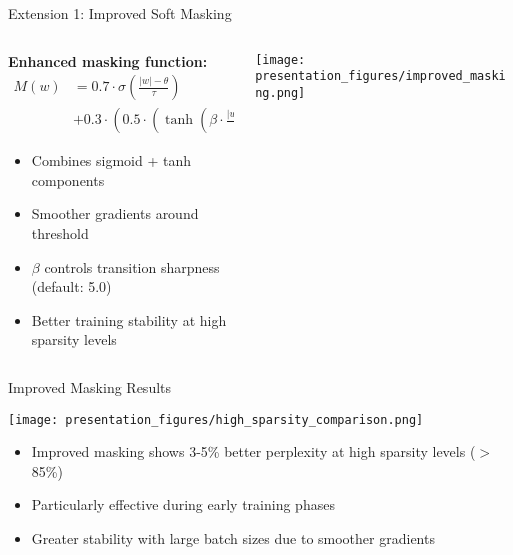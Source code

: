 \documentclass{beamer}
\begin{document}
\begin{frame}{Extension 1: Improved Soft Masking}
\begin{columns}
\begin{column}{0.5\textwidth}
\textbf{Enhanced masking function:}
\begin{align*}
M(w) &= 0.7 \cdot \sigma\left(\frac{|w| - \theta}{\tau}\right) \\
&+ 0.3 \cdot \left(0.5 \cdot \left(\tanh\left(\beta \cdot \frac{|w| - \theta}{\tau}\right) + 1\right)\right)
\end{align*}

\begin{itemize}
    \item Combines sigmoid + tanh components
    \item Smoother gradients around threshold
    \item $\beta$ controls transition sharpness (default: 5.0)
    \item Better training stability at high sparsity levels
\end{itemize}
\end{column}
\begin{column}{0.5\textwidth}
\begin{center}
\texttt{[image: presentation\_figures/improved\_masking.png]}
\end{center}
\end{column}
\end{columns}
\end{frame}

\begin{frame}{Improved Masking Results}
\begin{center}
\texttt{[image: presentation\_figures/high\_sparsity\_comparison.png]}
\end{center}
\begin{itemize}
    \item Improved masking shows 3-5\% better perplexity at high sparsity levels ($>$85\%)
    \item Particularly effective during early training phases
    \item Greater stability with large batch sizes due to smoother gradients
\end{itemize}
\end{frame}
\end{document}
